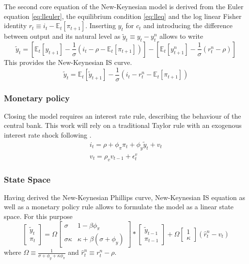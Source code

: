 \documentclass[12pt,a4paper,english]{article} %
\newcommand{\E}{\mathbb{E}} %
\begin{document}
	The second core equation of the New-Keynesian model is derived from the Euler equation \eqref{eq:lleuler}, the equilibrium condition \eqref{eq:lleq} and the log linear Fisher identity $r_t \equiv i_t - \E_t[\pi_{t+1}]$. Inserting $y_t$ for $c_t$ and introducing the difference between output and its natural level as $\tilde{y}_t \equiv y_t - y_t^n$ allows to write
	\begin{equation}
		\tilde{y}_t = 
		\left[
		\E_t[y_{t+1}] - \frac{1}{\sigma} (i_t - \rho - \E_t[\pi_{t+1}])
		\right]
		-
		\left[
		\E_t[y_{t+1}^n] - \frac{1}{\sigma} (r_t^n - \rho)
		\right]
	\end{equation}
	This provides the New-Keynesian IS curve.
	\begin{equation} \label{eq:llnkis}
		\tilde{y}_t = \E_t[\tilde{y}_{t+1}] - \frac{1}{\sigma} (i_t - r_t^n - \E_t[\pi_{t+1}])
	\end{equation}
	\subsubsection{Monetary policy}
	Closing the model requires an interest rate rule, describing the behaviour of the central bank. This work will rely on a traditional Taylor rule with an exogenous interest rate shock following \cite{gali_monetary_2008}.
	\begin{equation}
		\begin{aligned}
			i_t = \rho + \phi_{\pi} \pi_t + \phi_{y} \tilde{y}_t + v_t \\
			v_t = \rho_v v_{t-1} + \epsilon_t^v
		\end{aligned}
	\end{equation}

	\subsubsection{State Space}
	Having derived the New-Keynesian Phillips curve, New-Keynesian IS equation as well as a monetary policy rule allows to formulate the model as a linear state space. For this purpose 
	\begin{equation}
		\begin{bmatrix}
			\tilde{y}_t \\
			\pi_t
		\end{bmatrix}
		=
		\Omega
		\begin{bmatrix}
			\sigma & 1 - \beta \phi_{\pi} \\
			\sigma \kappa & \kappa + \beta (\sigma + \phi_y)
		\end{bmatrix}
		*
		\begin{bmatrix}
			\tilde{y}_{t-1} \\
			\pi_{t-1}
		\end{bmatrix}
		+
		\Omega
		\begin{bmatrix}
			1 \\
			\kappa
		\end{bmatrix}	
		(\hat{r}_t^n - v_t)
	\end{equation}
	where $\Omega \equiv \frac{1}{\sigma + \phi_y + \kappa \phi_{\pi}}$ and $\hat{r}_t^n \equiv r_t^n - \rho$.
	
\end{document}
